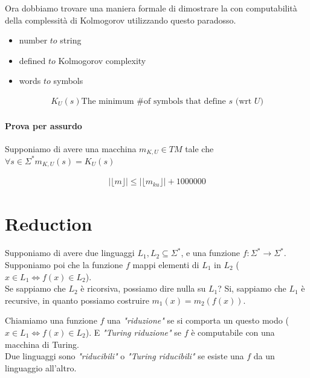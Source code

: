 \documentclass{article}
\newcommand{\floor}[1]{\ensuremath{\lfloor #1 \rfloor}}
\begin{document}
Ora dobbiamo trovare una maniera formale di dimostrare la con computabilità della complessità di Kolmogorov utilizzando questo paradosso.
\begin{itemize}
    \item number $to$ string
    \item defined $to$ Kolmogorov complexity
    \item words $to$ symbols
\end{itemize}

\begin{gather*}
    K_U(s) \text{The minimum \# of symbols that define $s$ (wrt $U$)}
\end{gather*}

\paragraph{Prova per assurdo}
Supponiamo di avere una macchina $m_{K,U} \in TM$ tale che $\forall s\in\Sigma^* m_{K,U}(s) = K_U(s)$
\begin{algorithm}
    \caption{$m$}
    \ForAll{$s\in\Sigma^*$}{
        \If{$K_U(s)>|\floor{m_{k,u}}|+1000000\footnotemark[1]$}{
            output $s$ and $HALT$\;
        }
    }
\end{algorithm}

\begin{gather*}
    |\floor{m}| \leq |\floor{m_{ku}}| + 1000000
\end{gather*}

\section{Reduction}
Supponiamo di avere due linguaggi $L_1, L_2 \subseteq \Sigma^*$, e una funzione $f:\Sigma^*\to \Sigma^*$. \\
Supponiamo poi che la funzione $f$ mappi elementi di $L_1$ in $L_2$ ($x\in L_1 \iff f(x)\in L_2$).\\
Se sappiamo che $L_2$ è ricorsiva, possiamo dire nulla su $L_1$? Si, sappiamo che $L_1$ è recursive, in quanto possiamo costruire $m_1(x)=m_2(f(x))$.

Chiamiamo una funzione $f$ una \textit{"riduzione"} se si comporta un questo modo ($x\in L_1 \iff f(x)\in L_2$). E \textit{"Turing riduzione"} se $f$ è computabile con una macchina di Turing. \\
Due linguaggi sono \textit{"riducibili"} o \textit{"Turing riducibili"} se esiste una $f$ da un linguaggio all'altro.
\end{document}
